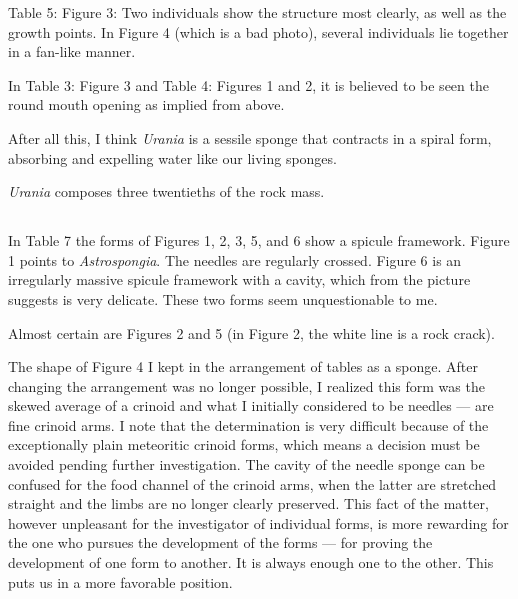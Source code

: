 \documentclass[a4paper, 12pt, oneside]{article}
\begin{document}
Table 5: Figure 3: Two individuals show the structure most clearly, as well as the growth points. In Figure 4 (which is a bad photo), several individuals lie together in a fan-like manner.

In Table 3: Figure 3 and Table 4: Figures 1 and 2, it is believed to be seen the round mouth opening as implied from above.

After all this, I think \emph{Urania} is a sessile sponge that contracts in a spiral form, absorbing and expelling water like our living sponges.

\emph{Urania} composes three twentieths of the rock mass.
\clearpage
\subsection{}
\paragraph*{}
In Table 7 the forms of Figures 1, 2, 3, 5, and 6 show a spicule framework. Figure 1 points to \emph{Astrospongia}. The needles are regularly crossed. Figure 6 is an irregularly massive spicule framework with a cavity, which from the picture suggests is very delicate. These two forms seem unquestionable to me.

Almost certain are Figures 2 and 5 (in Figure 2, the white line is a rock crack).

The shape of Figure 4 I kept in the arrangement of tables as a sponge. After changing the arrangement was no longer possible, I realized this form was the skewed average of a crinoid and what I initially considered to be needles --- are fine crinoid arms. I note that the determination is very difficult because of the exceptionally plain meteoritic crinoid forms, which means a decision must be avoided pending further investigation. The cavity of the needle sponge can be confused for the food channel of the crinoid arms, when the latter are stretched straight and the limbs are no longer clearly preserved. This fact of the matter, however unpleasant for the investigator of individual forms, is more rewarding for the one who pursues the development of the forms --- for proving the development of one form to another. It is always enough one to the other. This puts us in a more favorable position.
\clearpage
\subsection{}
\end{document}
